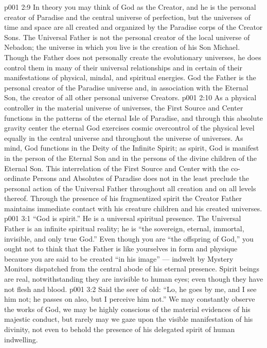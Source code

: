 \vs p001 2:9 \pc In theory you may think of God as the Creator, and he is the personal creator of Paradise and the central universe of perfection, but the universes of time and space are all created and organized by the Paradise corps of the Creator Sons. The Universal Father is not the personal creator of the local universe of Nebadon; the universe in which you live is the creation of his Son Michael. Though the Father does not personally create the evolutionary universes, he does control them in many of their universal relationships and in certain of their manifestations of physical, mindal, and spiritual energies. God the Father is the personal creator of the Paradise universe and, in association with the Eternal Son, the creator of all other personal universe Creators.
\vs p001 2:10 \pc As a physical controller in the material universe of universes, the First Source and Center functions in the patterns of the eternal Isle of Paradise, and through this absolute gravity center the eternal God exercises cosmic overcontrol of the physical level equally in the central universe and throughout the universe of universes. As mind, God functions in the Deity of the Infinite Spirit; as spirit, God is manifest in the person of the Eternal Son and in the persons of the divine children of the Eternal Son. This interrelation of the First Source and Center with the co\hyp{}ordinate Persons and Absolutes of Paradise does not in the least preclude the  personal action of the Universal Father throughout all creation and on all levels thereof. Through the presence of his fragmentized spirit the Creator Father maintains immediate contact with his creature children and his created universes.
\vs p001 3:1 “God is spirit.” He is a universal spiritual presence. The Universal Father is an infinite spiritual reality; he is “the sovereign, eternal, immortal, invisible, and only true God.” Even though you are “the offspring of God,” you ought not to think that the Father is like yourselves in form and physique because you are said to be created “in his image” --- indwelt by Mystery Monitors dispatched from the central abode of his eternal presence. Spirit beings are real, notwithstanding they are invisible to human eyes; even though they have not flesh and blood.
\vs p001 3:2 Said the seer of old: “Lo, he goes by me, and I see him not; he passes on also, but I perceive him not.” We may constantly observe the works of God, we may be highly conscious of the material evidences of his majestic conduct, but rarely may we gaze upon the visible manifestation of his divinity, not even to behold the presence of his delegated spirit of human indwelling.
